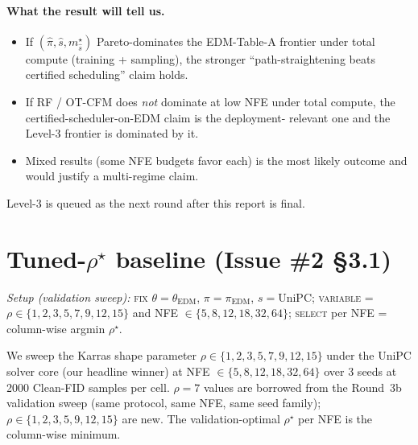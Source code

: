 \documentclass[11pt]{article}
\begin{document}
\paragraph{What the result will tell us.}
\begin{itemize}
\item If \((\hat\pi, \hat s, m^\star_{\hat s})\) Pareto-dominates the
EDM-Table-A frontier under total compute (training + sampling),
the stronger ``path-straightening beats certified scheduling'' claim
holds.
\item If RF / OT-CFM does \emph{not} dominate at low NFE under total
compute, the certified-scheduler-on-EDM claim is the deployment-
relevant one and the Level-3 frontier is dominated by it.
\item Mixed results (some NFE budgets favor each) is the most likely
outcome and would justify a multi-regime claim.
\end{itemize}

Level-3 is queued as the next round after this report is final.

\section{Tuned-\(\rho^\star\) baseline (Issue \#2 \S3.1)}
\label{sec:tuned-rho}

\noindent\textit{Setup (validation sweep):} \textsc{fix}
\(\theta = \theta_{\mathrm{EDM}}\), \(\pi = \pi_{\mathrm{EDM}}\),
\(s = \mathrm{UniPC}\); \textsc{variable} = \(\rho \in \{1,2,3,5,7,9,12,15\}\)
and NFE \(\in \{5,8,12,18,32,64\}\); \textsc{select} per NFE = column-wise
argmin \(\rho^\star\).

We sweep the Karras shape parameter
\(\rho \in \{1, 2, 3, 5, 7, 9, 12, 15\}\) under the UniPC solver core
(our headline winner) at NFE \(\in \{5, 8, 12, 18, 32, 64\}\) over 3
seeds at 2000 Clean-FID samples per cell. \(\rho{=}7\) values are
borrowed from the Round~3b validation sweep (same protocol, same NFE,
same seed family); \(\rho \in \{1,2,3,5,9,12,15\}\) are new. The
validation-optimal \(\rho^\star\) per NFE is the column-wise minimum.
\end{document}
